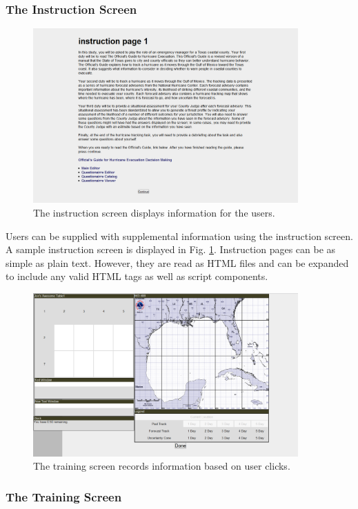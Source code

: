\documentclass[article]{ij4uq}              %
\begin{document}
\subsubsection{The Instruction Screen}

\begin{figure}[h!]
 \centering
 \includegraphics[width=4.0in]{figures/instruction_page.png}
 \caption{The instruction screen displays information for the users.}
 \label{fig:inst}
\end{figure}
\FloatBarrier

Users can be supplied with supplemental information using the instruction screen. A sample instruction screen is displayed in Fig. \ref{fig:inst}.  Instruction pages can be as simple as plain text.  However, they are read as HTML files and can be expanded to include any valid HTML tags as well as script components.

\begin{figure}[h!]
 \centering
 \includegraphics[width=4.0in]{figures/training_page.png}
 \caption{The training screen records information based on user clicks.}
 \label{fig:train}
\end{figure}
\FloatBarrier

\subsubsection{The Training Screen}
\end{document}
